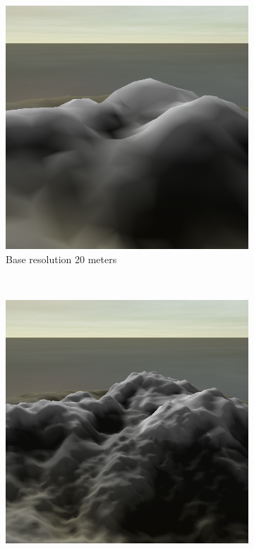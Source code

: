 \documentclass{article}
\begin{document}
\begin{figure}[H]
\centering
    \begin{subfigure}[b]{0.45\textwidth}
        \centering
        \includegraphics[scale=0.25]{image2}
        \caption{Base resolution 20 meters}
        \label{fig:image2}
    \end{subfigure}
    ~
    \begin{subfigure}[b]{0.45\textwidth}
        \centering
        \includegraphics[scale=0.25]{image10}

\end{subfigure}
\end{figure}
\end{document}
